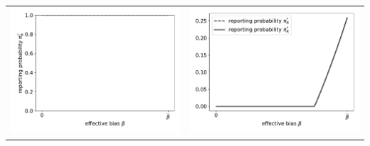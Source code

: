 \documentclass{article}
\begin{document}
\begin{tabular}{cc}
	\includegraphics[scale=.5]{effective_bias_reporting_probability} & \includegraphics[scale=.5]{effective_bias_reporting_probability_reporting_probability} \\

\end{tabular}
\end{document}
